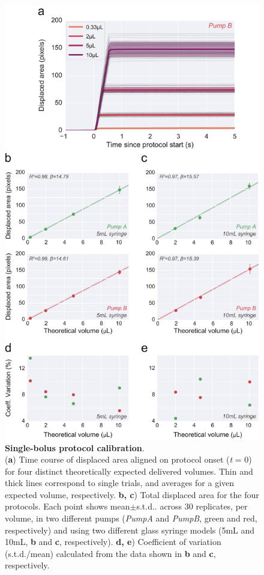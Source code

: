 \begin{figure}
	\centering
	\includegraphics[width=1.0\linewidth]{Figures/Artboard 5.pdf}
	\caption{\textbf{Single-bolus protocol calibration}.\\
		(\textbf{a}) Time course of displaced area aligned on protocol onset (\textit{t} = 0) for four distinct theoretically expected delivered volumes. Thin and thick lines correspond to single trials, and averages for a given expected volume, respectively. \textbf{b, c}) Total displaced area for the four protocols. Each point shows mean$\pm$s.t.d.. across 30 replicates, per volume, in two different pumps (\textit{PumpA} and \textit{PumpB}, green and red, respectively) and using two different glass syringe models (5mL and 10mL, \textbf{b} and \textbf{c}, respectively). \textbf{d, e}) Coefficient of variation (s.t.d./mean) calculated from the data shown in \textbf{b} and \textbf{c}, respectively.}
	\label{fig:SingleStepCalibration} 
\end{figure}

